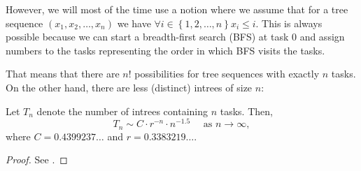 \begin{center}
\end{center}

However, we will most of the time use a notion where we assume that for a tree sequence $(x_1,x_2,\dots, x_n)$ we have $\forall i \in \left\{ 1,2,\dots,n \right\}x_i\leq i$. This is always possible because we can start a breadth-first search (BFS) at task 0 and assign numbers to the tasks representing the order in which BFS visits the tasks.

That means that there are $n!$ possibilities for tree sequences with exactly $n$ tasks. On the other hand, there are less (distinct) intrees of size $n$:

\begin{theorem}
  Let $T_n$ denote the number of intrees containing $n$ tasks. Then,
  \begin{equation*}
    T_n \sim C\cdot r^{-n}\cdot n^{-1.5} 
    \quad \text{ as } n\rightarrow \infty,
  \end{equation*}
  where $C=0.4399237\dots$ and $r=0.3383219\dots$.
\end{theorem}

\begin{proof}
  See \cite{asymptotic_enum_odlyzko}.
\end{proof}


